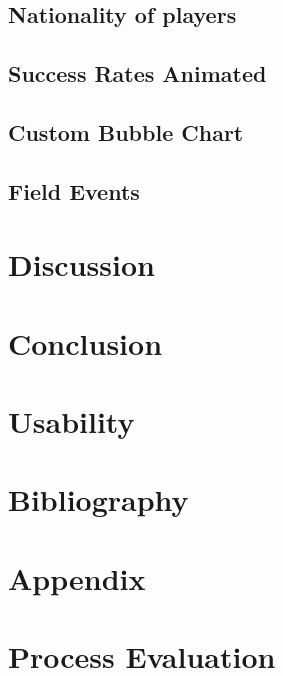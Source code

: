 \documentclass[a4paper,11pt]{article}
\begin{document}
\subsection{Nationality of players}

\subsection{Success Rates Animated}

\subsection{Custom Bubble Chart}

\subsection{Field Events}

\section{Discussion}

\section{Conclusion}

\section{Usability}

\section{Bibliography}



\section{Appendix}

\section{Process Evaluation}
\end{document}
